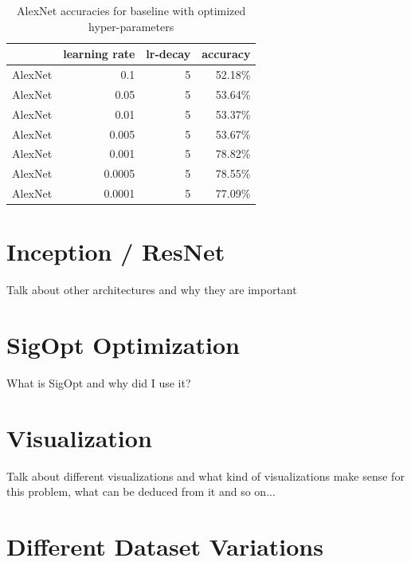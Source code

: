 \begin{table}[t] \centering
{}
\caption{AlexNet accuracies for baseline with optimized hyper-parameters}
\begin{tabular}{@{}rrrr@{}}
\toprule & learning rate & lr-decay & accuracy \\
\midrule
AlexNet		& 0.1 		& 5		& 52.18\%  \\
AlexNet		& 0.05 		& 5		& 53.64\%  \\
AlexNet		& 0.01 		& 5		& 53.37\%  \\
AlexNet		& 0.005 		& 5		& 53.67\%  \\
AlexNet		& 0.001 		& 5		& 78.82\%  \\
AlexNet		& 0.0005 		& 5		& 78.55\%  \\
AlexNet		& 0.0001 		& 5		& 77.09\%  \\
\bottomrule
\end{tabular}
\label{tbl:AlexNetBaseline}
\end{table}


\section{Inception / ResNet}

Talk about other architectures and why they are important

\section{SigOpt Optimization}

What is SigOpt and why did I use it?

\section{Visualization}

Talk about different visualizations and what kind of visualizations make sense for this problem, what can be deduced from it and so on... 

\section{Different Dataset Variations}

